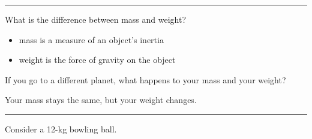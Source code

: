 \documentclass[10pt]{exam}
\newcommand{\hforce}[2]{
  \draw[f] (a) -- ++(#1, 0) 
        node[anchor=south] {#2};
}
\newcommand{\vforce}[2]{
  \draw[f] (a) -- ++(0, #1) 
        node[anchor=west] {#2};
}
\newcommand{\forceblank}{
  \,\fillin[][3em]\SI{}{\newton}
}
\begin{document}
\begin{questions}
\begin{parts}
\begin{center}
        \end{center}

    \end{parts}

  \hrule



  \question
    What is the difference between mass and weight?

    \begin{solution}[\stretch{1}]
      \begin{itemize}
        \item mass is a measure of an object's inertia
        \item weight is the force of gravity on the object
      \end{itemize}
    \end{solution}


	\question 
    If you go to a different planet, what happens to your mass and your weight?

    \begin{solution}[\stretch{2}]
      Your mass stays the same, but your weight changes.
    \end{solution}

  \hrule

  \question
    Consider a 12-kg bowling ball.
\end{questions}
\end{document}
